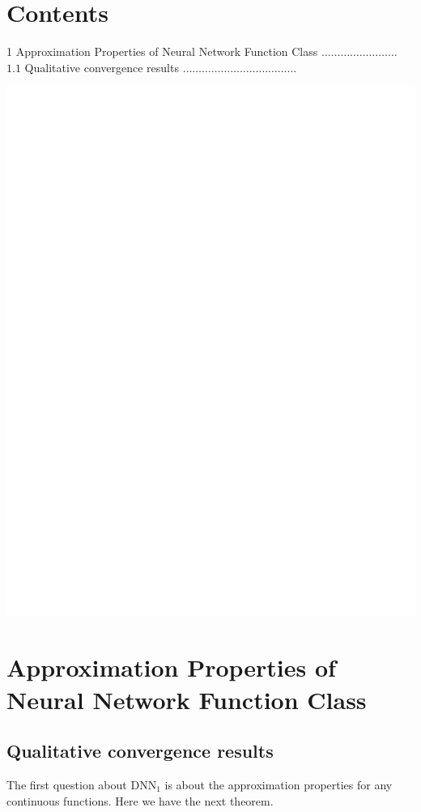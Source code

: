 \documentclass[10pt]{article}
\begin{document}
\section{Contents}
1 Approximation Properties of Neural Network Function Class $\ldots \ldots \ldots \ldots \ldots \ldots \ldots \ldots$ $1.1$ Qualitative convergence results $\ldots \ldots \ldots \ldots \ldots \ldots \ldots \ldots \ldots \ldots \ldots \ldots$

\includegraphics[max width=\textwidth]{2022_01_05_aa5252bbfe3db7fb6bc8g-2}

\section{Approximation Properties of Neural Network Function Class}
\subsection{Qualitative convergence results}
The first question about $\mathrm{DNN}_{1}$ is about the approximation properties for any continuous functions. Here we have the next theorem.
\end{document}
